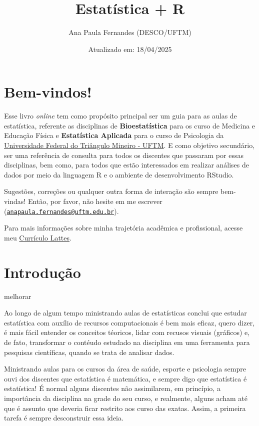 \documentclass[
]{book}
\title{Estatística + R}
\author{Ana Paula Fernandes (DESCO/UFTM)}
\date{Atualizado em: 18/04/2025}
\begin{document}
\maketitle

{
\setcounter{tocdepth}{1}
\tableofcontents
}
\chapter{Bem-vindos!}\label{bem-vindos}

Esse livro \emph{online} tem como propósito principal ser um guia para as aulas de estatística, referente as disciplinas de \textbf{Bioestatística} para os curso de Medicina e Educação Física e \textbf{Estatística Aplicada} para o curso de Psicologia da \href{http://www.uftm.edu.br}{Universidade Federal do Triângulo Mineiro - UFTM}. E como objetivo secundário, ser uma referência de consulta para todos os discentes que passaram por essas disciplinas, bem como, para todos que estão interessados em realizar análises de dados por meio da linguagem R e o ambiente de desenvolvimento RStudio.

Sugestões, correções ou qualquer outra forma de interação são sempre bem-vindas! Então, por favor, não hesite em me escrever (\href{mailto:anapaula.fernandes@uftm.edu.br}{\nolinkurl{anapaula.fernandes@uftm.edu.br}}).

Para mais informações sobre minha trajetória acadêmica e profissional, acesse meu \href{https://lattes.cnpq.br/5582801060910261}{Currículo Lattes}.

\chapter{Introdução}\label{intro}

melhorar

Ao longo de algum tempo ministrando aulas de estatísticas conclui que estudar estatística com auxílio de recursos computacionais é bem mais eficaz, quero dizer, é mais fácil entender os conceitos téoricos, lidar com recusos visuais (gráficos) e, de fato, transformar o contéudo estudado na disciplina em uma ferramenta para pesquisas científicas, quando se trata de analisar dados.

Ministrando aulas para os cursos da área de saúde, esporte e psicologia sempre ouvi dos discentes que estatística é matemática, e sempre digo que estatística é estatística! É normal alguns discentes não assimilarem, em princípio, a importância da disciplina na grade do seu curso, e realmente, alguns acham até que é assunto que deveria ficar restrito aos curso das exatas. Assim, a primeira tarefa é sempre desconstruir essa ideia.
\end{document}
